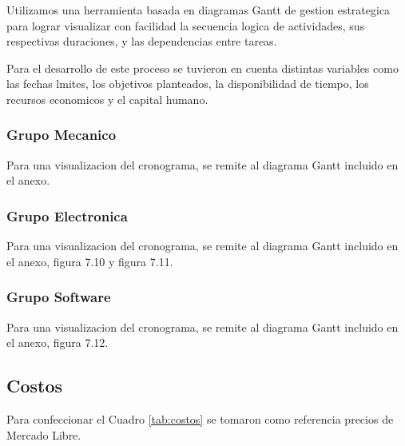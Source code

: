     Utilizamos una herramienta basada en diagramas Gantt de gestion estrategica para lograr
    visualizar con facilidad la secuencia logica de actividades, sus respectivas duraciones, y las
    dependencias entre tareas.

    Para el desarrollo de este proceso se tuvieron en cuenta distintas variables como las fechas
    lmites, los objetivos planteados, la disponibilidad de tiempo, los recursos economicos y el
    capital humano.

    \subsubsection{Grupo Mecanico}
    Para una visualizacion del cronograma, se remite al diagrama Gantt incluido en el anexo.
    \subsubsection{Grupo Electronica}
    Para una visualizacion del cronograma, se remite al diagrama Gantt incluido en el anexo,
    figura 7.10 y figura 7.11.
    \subsubsection{Grupo Software}
    Para una visualizacion del cronograma, se remite al diagrama Gantt incluido en el anexo,
    figura 7.12.

  \subsection{Costos}
    Para confeccionar el Cuadro \ref{tab:costos} se tomaron como referencia precios de
    Mercado Libre.


